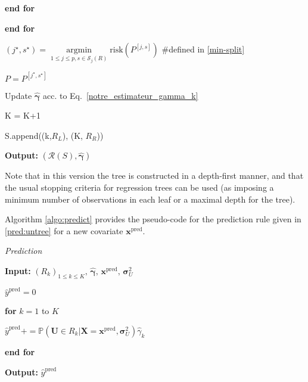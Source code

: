 \documentclass[twoside,11pt]{article}
\begin{document}
\begin{algorithm}
             \hspace{\parindent} \textbf{end for}
            
             \textbf{end for}
            
            $(j^\star, s^\star)=\underset{1\leq j \leq p, s \in \mathcal{S}_j(R)}{\operatorname{argmin}} \text{risk}(P^{[j,s]})$ \#defined in \eqref{min-split}
            
            $P = P^{[j^\star, s^\star]}$
        
            Update $\hat{\boldsymbol{\gamma}}$ acc. to Eq.~\ref{notre_estimateur_gamma_k}
            
            K = K+1
            
            S.append((k,$R_L$), (K, $R_R$))
            
            
            
    \noindent \textbf{Output:} $(\mathcal{R}(S),\hat{\boldsymbol{\gamma}})$
    \label{algo:buid_tree}

\end{algorithm}

Note that in this version the tree is constructed in a depth-first manner, and that the usual stopping criteria for regression trees can be used (as imposing a minimum number of observations in each leaf or a maximal depth for the tree).

Algorithm \ref{algo:predict} provides the pseudo-code for the prediction rule given in  \eqref{pred:untree} for a new covariate $\boldsymbol{x}^\text{pred}$. 

\begin{algorithm}{\textit{Prediction}}

    \noindent \textbf{Input:}  $(R_{k})_{1 \le k \le K}, \, \hat{\boldsymbol{\gamma}}, \, \boldsymbol{x}^{\text{pred}}, \, {\boldsymbol{\sigma}}_U^2 $
    

    
    \noindent $\hat{y}^{\text{pred}} = 0 $
    
    \noindent \textbf{for} $k=1$ to $K$  
    
    $\hat{y}^{\text{pred}} +=  \mathbb{P}(\mathbf{U} \in R_k | \mathbf{X} = \boldsymbol{x}^{\text{pred}}, {\boldsymbol{\sigma}}_U^2) \hat{\gamma}_k$
    

    
 \noindent \textbf{end for}
            
    \noindent \textbf{Output:} $\hat{y}^{\text{pred}}$ 
    \label{algo:predict}

\end{algorithm}
\end{document}
